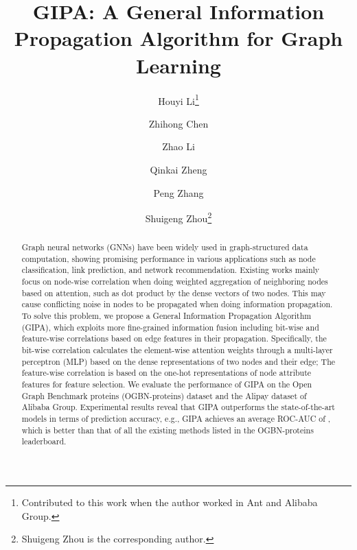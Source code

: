 \documentclass[runningheads]{llncs}
\newcommand{\model}{GIPA\xspace}
\begin{document}
\title{GIPA: A General Information Propagation Algorithm for Graph Learning}

\author{
Houyi Li\thanks{Contributed to this work when the author worked in Ant and Alibaba Group.} \and
Zhihong Chen \and
Zhao Li \and
Qinkai Zheng  \and
Peng Zhang \and
Shuigeng Zhou\thanks{Shuigeng Zhou is the corresponding author.}}
\maketitle              \begin{abstract}
Graph neural networks (GNNs) have been widely used in graph-structured data computation, showing promising performance in various applications such as node classification, link prediction, and network recommendation.
Existing works mainly focus on node-wise correlation when doing weighted aggregation of neighboring nodes based on attention, such as dot product by the dense vectors of two nodes. This may cause conflicting noise in nodes to be propagated when doing information propagation. To solve this problem, we propose a General Information Propagation Algorithm (\model), which exploits more fine-grained information fusion including bit-wise and feature-wise correlations based on edge features in their propagation. Specifically, the bit-wise correlation calculates the element-wise attention weights through a multi-layer perceptron (MLP) based on the dense representations of two nodes and their edge; The feature-wise correlation is based on the one-hot representations of node attribute features for feature selection. We evaluate the performance of \model on the Open Graph Benchmark proteins (OGBN-proteins) dataset and the Alipay dataset of Alibaba Group.
Experimental results reveal that \model outperforms the state-of-the-art models in terms of prediction accuracy, e.g., \model achieves an average ROC-AUC of , which is better than that of all the existing methods listed in the OGBN-proteins leaderboard.

\end{abstract}
\end{document}
